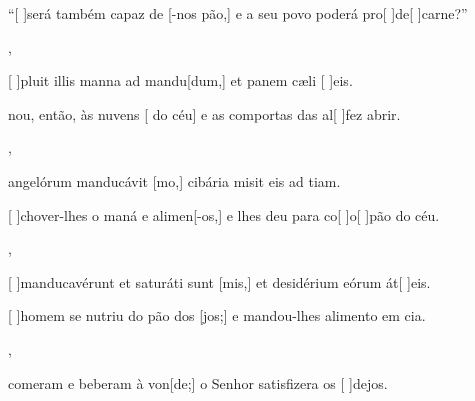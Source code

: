 {        {\item {}“[ ]{se}rá também capaz de [-nos pão,] e a seu povo poderá pro[ ]{de}[ ]{car}ne?''~\Antiphona},
    {\item {}[ ]{plu}it illis manna ad mandu[dum,] et panem cæli [ ]{e}is.~\Antiphona}%
        {\item {}nou, então, às nuvens [ do céu] e as comportas das al[ ]{fez } abrir.~\Antiphona},
    {\item {} angelórum manducávit [mo,] cibária misit eis ad tiam.~\Antiphona}%
        {\item {}[ ]{cho}ver-lhes o maná e alimen[-os,] e lhes deu para co[ ]{o}[ ]{pão} do céu.~\Antiphona},
    {\item {}[ ]{man}ducavérunt et saturáti sunt [mis,] et desidérium eórum át[ ]{e}is.~\Antiphona}%
        {\item {}[ ]{ho}mem se nutriu do pão dos [jos;] e mandou-lhes alimento em cia.~\Antiphona},
    {~\Antiphona}%
        {\item {} comeram e beberam à von[de;] o Senhor satisfizera os [ ]{de}jos.~\Antiphona}
}